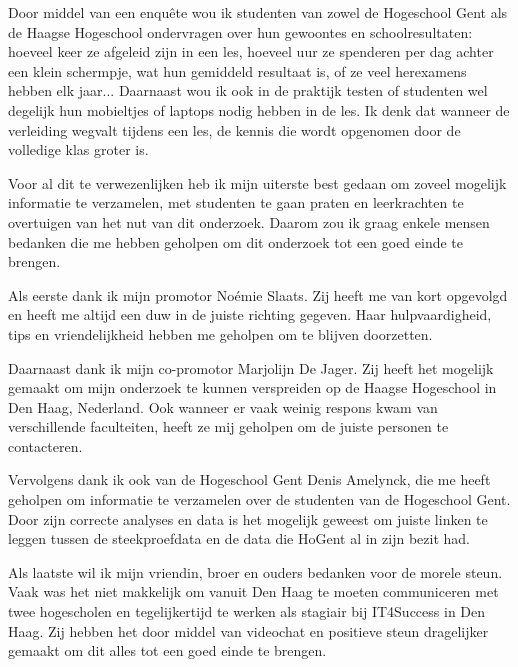 Door middel van een enquête wou ik studenten van zowel de Hogeschool Gent als de Haagse Hogeschool ondervragen over hun gewoontes en schoolresultaten: hoeveel keer ze afgeleid zijn in een les, hoeveel uur ze spenderen per dag achter een klein schermpje, wat hun gemiddeld resultaat is, of ze veel herexamens hebben elk jaar... Daarnaast wou ik ook in de praktijk testen of studenten wel degelijk hun mobieltjes of laptops nodig hebben in de les. Ik denk dat wanneer de verleiding wegvalt tijdens een les, de kennis die wordt opgenomen door de volledige klas groter is.

Voor al dit te verwezenlijken heb ik mijn uiterste best gedaan om zoveel mogelijk informatie te verzamelen, met studenten te gaan praten en leerkrachten te overtuigen van het nut van dit onderzoek. Daarom zou ik graag enkele mensen bedanken die me hebben geholpen om dit onderzoek tot een goed einde te brengen.

Als eerste dank ik mijn promotor Noémie Slaats. Zij heeft me van kort opgevolgd en heeft me altijd een duw in de juiste richting gegeven. Haar hulpvaardigheid, tips en vriendelijkheid hebben me geholpen om te blijven doorzetten.

Daarnaast dank ik mijn co-promotor Marjolijn De Jager. Zij heeft het mogelijk gemaakt om mijn onderzoek te kunnen verspreiden op de Haagse Hogeschool in Den Haag, Nederland. Ook wanneer er vaak weinig respons kwam van verschillende faculteiten, heeft ze mij geholpen om de juiste personen te contacteren.

Vervolgens dank ik ook van de Hogeschool Gent Denis Amelynck, die me heeft geholpen om informatie te verzamelen over de studenten van de Hogeschool Gent. Door zijn correcte analyses en data is het mogelijk geweest om juiste linken te leggen tussen de steekproefdata en de data die HoGent al in zijn bezit had.

Als laatste wil ik mijn vriendin, broer en ouders bedanken voor de morele steun. Vaak was het niet makkelijk om vanuit Den Haag te moeten communiceren met twee hogescholen en tegelijkertijd te werken als stagiair bij IT4Success in Den Haag. Zij hebben het door middel van videochat en positieve steun dragelijker gemaakt om dit alles tot een goed einde te brengen.